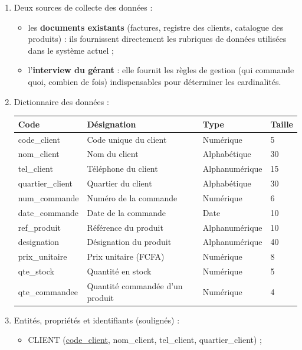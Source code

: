 \documentclass[11pt]{article}
\begin{document}
\begin{corrige}
\begin{enumerate}
\item Deux sources de collecte des données :
\begin{itemize}
\item les \textbf{documents existants} (factures, registre des clients, catalogue des produits) : ils fournissent directement les rubriques de données utilisées dans le système actuel ;
\item l'\textbf{interview du gérant} : elle fournit les règles de gestion (qui commande quoi, combien de fois) indispensables pour déterminer les cardinalités.
\end{itemize}
\item Dictionnaire des données :
\begin{center}
\begin{tabularx}{\linewidth}{|l|X|l|l|}
\hline
\rowcolor{popblueL} \textbf{Code} & \textbf{Désignation} & \textbf{Type} & \textbf{Taille} \\
\hline
code\_client & Code unique du client & Numérique & 5 \\
\hline
nom\_client & Nom du client & Alphabétique & 30 \\
\hline
tel\_client & Téléphone du client & Alphanumérique & 15 \\
\hline
quartier\_client & Quartier du client & Alphabétique & 30 \\
\hline
num\_commande & Numéro de la commande & Numérique & 6 \\
\hline
date\_commande & Date de la commande & Date & 10 \\
\hline
ref\_produit & Référence du produit & Alphanumérique & 10 \\
\hline
designation & Désignation du produit & Alphanumérique & 40 \\
\hline
prix\_unitaire & Prix unitaire (FCFA) & Numérique & 8 \\
\hline
qte\_stock & Quantité en stock & Numérique & 5 \\
\hline
qte\_commandee & Quantité commandée d'un produit & Numérique & 4 \\
\hline
\end{tabularx}
\end{center}
\item Entités, propriétés et identifiants (soulignés) :
\begin{itemize}
\item CLIENT (\underline{code\_client}, nom\_client, tel\_client, quartier\_client) ;

\end{itemize}
\end{enumerate}
\end{corrige}
\end{document}
